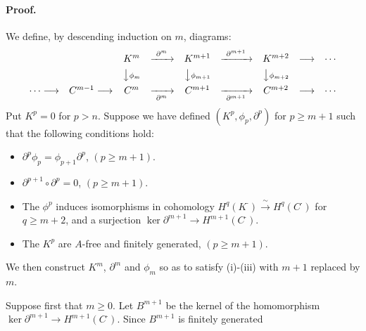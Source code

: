 \paragraph{Proof.}
We define, by descending induction on $m$, diagrams:
\[
\begin{array}{ccccccccc}
 & & K^{m} & \xrightarrow{\ \partial^{m}\ } & K^{m+1}
   & \xrightarrow{\ \partial^{m+1}\ } & K^{m+2} & \longrightarrow & \cdots \\[4pt]
 & & \big\downarrow{\scriptstyle \phi_{m}} & & \big\downarrow{\scriptstyle \phi_{m+1}}
   & & \big\downarrow{\scriptstyle \phi_{m+2}} & & \\[4pt]
\cdots \longrightarrow & C^{m-1} \longrightarrow & C^{m}
   & \xrightarrow[\ \partial^{m}\ ]{} & C^{m+1}
   & \xrightarrow[\ \partial^{m+1}\ ]{} & C^{m+2} & \longrightarrow & \cdots
\end{array}
\]
Put $K^p = 0$ for $p > n$. Suppose we have defined
$(K^p, \phi_p, \partial^p)$ for $p \geq m + 1$ such that the following
conditions hold:
\begin{itemize}
  \item[(i)] $\partial^p \phi_p = \phi_{p+1} \partial^p$, $(p \geq m + 1)$.
  \item[(ii)] $\partial^{p+1} \circ \partial^p = 0$, $(p \geq m + 1)$.
  \item[(iii)] The $\phi^p$ induces isomorphisms in cohomology
    $H^q(K^{\cdot}) \xrightarrow{\ \sim\ } H^q(C^{\cdot})$ for
    $q \geq m + 2$, and a surjection
    $\ker \partial^{m+1} \to H^{m+1}(C^{\cdot})$.
  \item[(iv)] The $K^p$ are $A$-free and finitely generated,
    $(p \geq m + 1)$.
\end{itemize}
We then construct $K^m$, $\partial^m$ and $\phi_m$ so as to satisfy
(i)-(iii) with $m + 1$ replaced by $m$.

Suppose first that $m \geq 0$. Let $B^{m+1}$ be the kernel of the
homomorphism $\ker \partial^{m+1} \to H^{m+1}(C^{\cdot})$. Since $B^{m+1}$
is finitely generated

